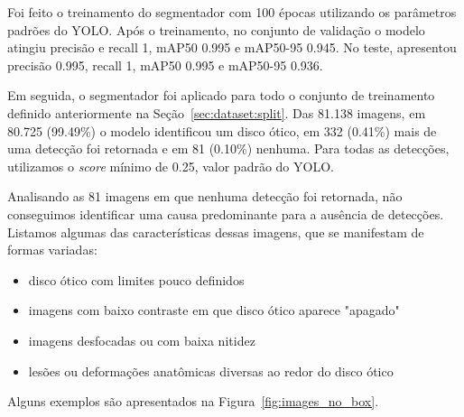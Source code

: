 \documentclass[12pt]{article}
\begin{document}
Foi feito o treinamento do segmentador com 100 épocas utilizando os parâmetros padrões do YOLO. Após o treinamento, no conjunto de validação o modelo atingiu precisão e recall 1, mAP50 0.995 e mAP50-95 0.945. No teste, apresentou precisão 0.995, recall 1, mAP50 0.995 e mAP50-95 0.936.


Em seguida, o segmentador foi aplicado para todo o conjunto de treinamento definido anteriormente na Seção~\ref{sec:dataset:split}. Das 81.138 imagens, em 80.725 (99.49\%) o modelo identificou um disco ótico, em 332 (0.41\%) mais de uma detecção foi retornada e em 81 (0.10\%) nenhuma. Para todas as detecções, utilizamos o \emph{score} mínimo de 0.25, valor padrão do YOLO.

Analisando as 81 imagens em que nenhuma detecção foi retornada, não conseguimos identificar uma causa predominante para a ausência de detecções. Listamos algumas das características dessas imagens, que se manifestam de formas variadas:

\begin{itemize}[noitemsep,topsep=0pt]
    \item disco ótico com limites pouco definidos
    \item imagens com baixo contraste em que disco ótico aparece "apagado"
    \item imagens desfocadas ou com baixa nitidez
    \item lesões ou deformações anatômicas diversas ao redor do disco ótico
\end{itemize}



Alguns exemplos são apresentados na Figura~\ref{fig:images_no_box}.
\end{document}
